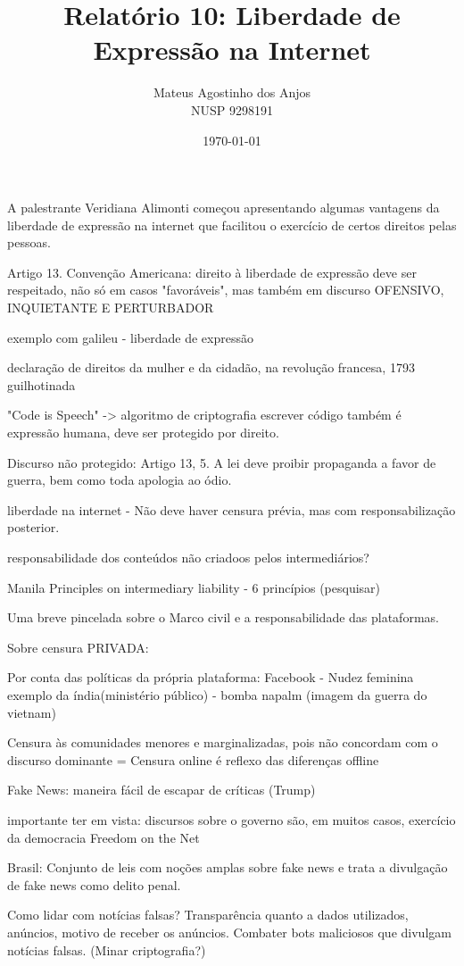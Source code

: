 \documentclass[12pt]{article}
\title{Relatório 10: Liberdade de Expressão na Internet}
\author{Mateus Agostinho dos Anjos\\NUSP 9298191}
\date{\today}
\begin{document}
	\maketitle
	\paragraph{}
		A palestrante Veridiana Alimonti começou apresentando algumas vantagens
		da liberdade de expressão na internet que facilitou o exercício de certos 
		direitos pelas pessoas.

Artigo 13. Convenção Americana: direito à liberdade de expressão deve ser
respeitado, não só em casos "favoráveis", mas também em discurso OFENSIVO,
INQUIETANTE E PERTURBADOR

exemplo com galileu - liberdade de expressão

declaração de direitos da mulher e da cidadão, na revolução francesa, 1793
guilhotinada

"Code is Speech" -> algoritmo de criptografia 
escrever código também é expressão humana, deve ser protegido por direito.

Discurso não protegido: Artigo 13, 5. A lei deve proibir propaganda a favor de
guerra, bem como toda apologia ao ódio.

liberdade na internet - Não deve haver censura prévia, mas com 
responsabilização posterior.

responsabilidade dos conteúdos não criadoos pelos intermediários?

Manila Principles on intermediary liability - 6 princípios (pesquisar)

Uma breve pincelada sobre o Marco civil e a responsabilidade das
plataformas.

Sobre censura PRIVADA:

Por conta das políticas da própria plataforma:
Facebook - Nudez feminina exemplo da índia(ministério público) - bomba napalm
(imagem da guerra do vietnam)


Censura às comunidades menores e marginalizadas, pois não concordam com o
discurso dominante = Censura online é reflexo das diferenças offline

Fake News: maneira fácil de escapar de críticas (Trump)

importante ter em vista: discursos sobre o governo são, em muitos casos,
exercício da democracia
Freedom on the Net

Brasil: Conjunto de leis com noções amplas sobre fake news e trata a
divulgação de fake news como delito penal.

Como lidar com notícias falsas? Transparência quanto a dados utilizados,
anúncios, motivo de receber os anúncios. Combater bots maliciosos que
divulgam notícias falsas. (Minar criptografia?)
\end{document}
